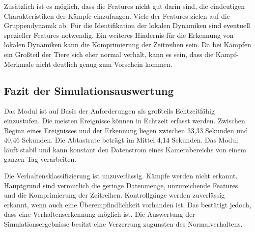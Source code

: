 Zusätzlich ist es möglich, dass die Features nicht gut darin sind, die eindeutigen Charakteristiken der Kämpfe einzufangen. Viele der Features zielen auf die Gruppendynamik ab. Für die Identifikation der lokalen Dynamiken sind eventuell spezieller Features notwendig. Ein weiteres Hindernis für die Erkennung von lokalen Dynamiken kann die Komprimierung der Zeitreihen sein. Da bei Kämpfen ein Großteil der Tiere sich eher normal verhält, kann es sein, dass die Kampf-Merkmale nicht deutlich genug zum Vorschein kommen. \par


\subsection{Fazit der Simulationsauswertung}
Das Modul ist auf Basis der Anforderungen als großteils Echtzeitfähig einzustufen. Die meisten Ereignisse können in Echtzeit erfasst werden. Zwischen Beginn eines Ereignisses und der Erkennung liegen zwischen 33,33 Sekunden und 40,46 Sekunden. Die Abtastrate beträgt im Mittel 4,14 Sekunden. Das Modul läuft stabil und kann konstant den Datenstrom eines Kamerabereichs von einem ganzen Tag verarbeiten. \par

Die Verhaltensklassifizierung ist unzuverlässig. Kämpfe werden nicht erkannt. Hauptgrund sind vermutlich die geringe Datenmenge, unzureichende Features und die Komprimierung der Zeitreihen. Kontrollgänge werden zuverlässig erkannt, wenn auch eine Überempfindlichkeit vorhanden ist. Das bestätigt jedoch, dass eine Verhaltenserkennung möglich ist. Die Auswertung der Simulationsergebnisse besitzt eine Verzerrung zugunsten des Normalverhaltens. 